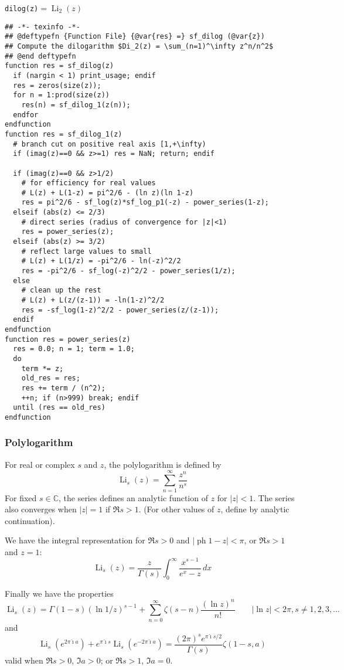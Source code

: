 \documentclass[10pt,dvipdfmx,letterpaper,twoside]{article}
\let\O=\operatorname
\newcommand{\CC}{{\mathbb{C}}}
\newcommand{\ii}{{\hat{\imath}}}
\let\Gam=\Gamma
\begin{document}
\begin{titled-frame}{{\tt dilog(z)}${}=\O{Li}_2(z)$}
\small%
\begin{verbatim}
## -*- texinfo -*-
## @deftypefn {Function File} {@var{res} =} sf_dilog (@var{z})
## Compute the dilogarithm $Di_2(z) = \sum_(n=1)^\infty z^n/n^2$
## @end deftypefn
function res = sf_dilog(z)
  if (nargin < 1) print_usage; endif
  res = zeros(size(z));
  for n = 1:prod(size(z))
    res(n) = sf_dilog_1(z(n));
  endfor
endfunction
function res = sf_dilog_1(z)
  # branch cut on positive real axis [1,+\infty)
  if (imag(z)==0 && z>=1) res = NaN; return; endif

  if (imag(z)==0 && z>1/2)
    # for efficiency for real values
    # L(z) + L(1-z) = pi^2/6 - (ln z)(ln 1-z)
    res = pi^2/6 - sf_log(z)*sf_log_p1(-z) - power_series(1-z);
  elseif (abs(z) <= 2/3)
    # direct series (radius of convergence for |z|<1)
    res = power_series(z);
  elseif (abs(z) >= 3/2)
    # reflect large values to small
    # L(z) + L(1/z) = -pi^2/6 - ln(-z)^2/2
    res = -pi^2/6 - sf_log(-z)^2/2 - power_series(1/z);
  else
    # clean up the rest
    # L(z) + L(z/(z-1)) = -ln(1-z)^2/2
    res = -sf_log(1-z)^2/2 - power_series(z/(z-1));
  endif
endfunction
function res = power_series(z)
  res = 0.0; n = 1; term = 1.0;
  do
    term *= z;
    old_res = res;
    res += term / (n^2);
    ++n; if (n>999) break; endif
  until (res == old_res)
endfunction
\end{verbatim}
\end{titled-frame}


\subsubsection{Polylogarithm}
For real or complex $s$ and $z$, the polylogarithm is defined by
\[ \O{Li}_s(z) = \sum_{n=1}^\infty \frac{z^n}{n^s} \]
For fixed $s\in\CC$, the series defines an analytic function of $z$ for $|z|<1$.  The series also converges
when $|z|=1$ if $\Re s>1$.  (For other values of $z$, define by analytic continuation).

We have the integral representation for $\Re s>0$ and $|\O{ph} 1-z|<\pi$, or $\Re s>1$ and $z=1$:
\[ \O{Li}_s(z) = \frac{z}{\Gam(s)} \int_0^\infty \frac{x^{s-1}}{e^x - z}\,dx \]

Finally we have the properties
\[ \O{Li}_s(z) = \Gam(1-s)(\ln 1/z)^{s-1} + \sum_{n=0}^\infty \zeta(s-n)\frac{(\ln z)^n}{n!}
    \qquad |\ln z|<2\pi, s\neq1,2,3,\dots \]
and
\[ \O{Li}_s(e^{2\pi\ii a}) + e^{\pi\ii s}\O{Li}_s(e^{-2\pi\ii a}) = \frac{(2\pi)^s e^{\pi\ii s/2}}{\Gam(s)}\zeta(1-s, a) \]
valid when $\Re s>0$, $\Im a>0$; or $\Re s>1$, $\Im a=0$.
\end{document}
